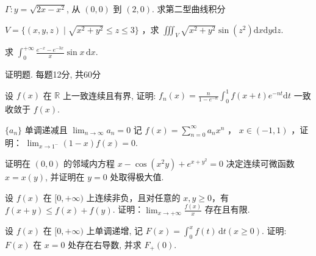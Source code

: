 \par{}
$\Gamma: y = \sqrt{2x - x^2}$, 从 $(0,0)$ 到 $(2,0)$. 求第二型曲线积分\par
\nopagebreak[4]
$V = \{(x,y,z)\mid \sqrt{x^2 + y^2}\leq z\leq 3\}$ ，求 $\iiint_{V}\sqrt{x^2 + y^2}\sin (z^2)\mathrm{d}x\mathrm{d}y\mathrm{d}z.$\par
求 $\int_0^{+\infty} \frac{e^{-x} - e^{-3x}}{x} \sin x \, \mathrm{d}x$.\par
\par{}
证明题. 每题12分, 共60分\par
设 $f(x)$ 在 $\mathbb{R}$ 上一致连续且有界, 证明: $f_{n}(x) = \frac{n}{1 - e^{-n}} \int_{0}^{1} f(x + t) e^{-nt} \mathrm{d}t$ 一致收敛于 $f(x)$.\par
$\{a_{n}\}$ 单调递减且 $\lim_{n\to \infty}a_n = 0$ 记 $f(x) = \sum_{n = 0}^{\infty}a_nx^n$ ， $x\in (-1,1)$ ，证明： $\lim_{x\to 1^{-}}(1 - x)f(x) = 0.$\par
证明在 $(0,0)$ 的邻域内方程 $x - \cos (x^2 y) + e^{x + y^2} = 0$ 决定连续可微函数 $x = x(y)$, 并证明在 $y = 0$ 处取得极大值.\par
设 $f(x)$ 在 $[0, +\infty)$ 上连续非负，且对任意的 $x, y \geq 0$，有 $f(x + y) \leq f(x) + f(y)$. 证明：$\lim_{x \to +\infty} \frac{f(x)}{x}$ 存在且有限.\par
设 $f(x)$ 在 $[0, +\infty)$ 上单调递增, 记 $F(x) = \int_0^x f(t) \, \mathrm{d}t (x \geq 0)$. 证明: $F(x)$ 在 $x = 0$ 处存在右导数, 并求 $F_+(0)$.\par
